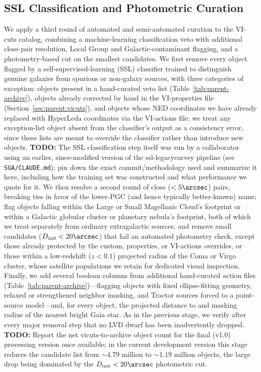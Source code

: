 \documentclass[modern,linenumbers]{aastex701}
\newcommand{\todo}[1]{{\color{red}\textbf{TODO:} #1}}
\begin{document}


\subsection{SSL Classification and Photometric Curation}
\label{sec:parent:archive}

We apply a third round of automated and semi-automated curation to the
VI-cuts catalog, combining a machine-learning classification veto with
additional close-pair resolution, Local Group and Galactic-contaminant
flagging, and a photometry-based cut on the smallest candidates. We
first remove every object flagged by a self-supervised-learning (SSL)
classifier trained to distinguish genuine galaxies from spurious or
non-galaxy sources, with three categories of exception: objects present
in a hand-curated veto list (Table~\ref{tab:parent-archive}), objects
already corrected by hand in the VI-properties file
(Section~\ref{sec:parent:vicuts}), and objects whose NED coordinates we
have already replaced with HyperLeda coordinates via the VI-actions
file; we treat any exception-list object absent from the classifier's
output as a consistency error, since these lists are meant to override
the classifier rather than introduce new objects. \todo{The SSL
  classification step itself was run by a collaborator using an earlier,
  since-modified version of the ssl-legacysurvey pipeline (see
  \texttt{SGA/CLAUDE.md}); pin down the exact commit/methodology used
  and summarize it here, including how the training set was constructed
  and what performance we quote for it.}  We then resolve a second round
of close ($<5\arcsec$) pairs, breaking ties in favor of the lower-PGC
(and hence typically better-known) name; flag objects falling within the
Large or Small Magellanic Cloud's footprint or within a Galactic
globular cluster or planetary nebula's footprint, both of which we treat
separately from ordinary extragalactic sources; and remove small
candidates ($D_{\rm init} < 20\arcsec$) that fail an automated
photometry check, except those already protected by the custom,
properties, or VI-actions overrides, or those within a low-redshift
($z < 0.1$) projected radius of the Coma or Virgo cluster, whose
satellite populations we retain for dedicated visual inspection.
Finally, we add several boolean columns from additional hand-curated
action files (Table~\ref{tab:parent-archive})---flagging objects with
fixed ellipse-fitting geometry, relaxed or strengthened neighbor
masking, and Tractor sources forced to a point-source model---and, for
every object, the projected distance to and masking radius of the
nearest bright Gaia star. As in the previous stage, we verify after
every major removal step that no LVD dwarf has been inadvertently
dropped. \todo{Report the net vicuts-to-archive object count for the
  final (v1.0) processing version once available; in the current
  development version this stage reduces the candidate list from
  $\sim\!4.79$ million to $\sim\!1.19$ million objects, the large drop
  being dominated by the $D_{\rm init} < 20\arcsec$ photometric cut.}
\end{document}

